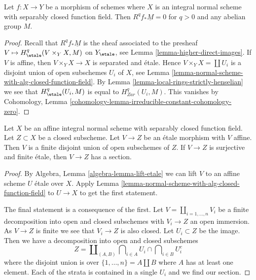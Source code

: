 \begin{lemma}
\label{lemma-Rf-star-zero-normal-with-alg-closed-function-field}
Let $f : X \to Y$ be a morphism of schemes where $X$ is an integral
normal scheme with separably closed function field. Then
$R^qf_*\underline{M} = 0$ for $q > 0$ and any abelian group $M$.
\end{lemma}

\begin{proof}
Recall that $R^qf_*\underline{M}$ is the sheaf associated
to the presheaf $V \mapsto H^q_\etale(V \times_Y X, M)$ on $Y_\etale$, see
Lemma \ref{lemma-higher-direct-images}.
If $V$ is affine, then $V \times_Y X \to X$ is separated and \'etale.
Hence $V \times_Y X = \coprod U_i$ is a disjoint union of open
subschemes $U_i$ of $X$, see
Lemma \ref{lemma-normal-scheme-with-alg-closed-function-field}.
By Lemma \ref{lemma-local-rings-strictly-henselian}
we see that $H^q_\etale(U_i, M)$ is equal to
$H^q_{Zar}(U_i, M)$. This vanishes by
Cohomology, Lemma \ref{cohomology-lemma-irreducible-constant-cohomology-zero}.
\end{proof}

\begin{lemma}
\label{lemma-closed-of-affine-normal-scheme-with-alg-closed-function-field}
Let $X$ be an affine integral normal scheme with separably closed
function field. Let $Z \subset X$ be a closed subscheme. Let
$V \to Z$ be an \'etale morphism with $V$ affine. Then $V$ is a finite
disjoint union of open subschemes of $Z$. If $V \to Z$ is
surjective and finite \'etale, then $V \to Z$ has a section.
\end{lemma}

\begin{proof}
By Algebra, Lemma \ref{algebra-lemma-lift-etale}
we can lift $V$ to an affine scheme $U$ \'etale over $X$.
Apply Lemma \ref{lemma-normal-scheme-with-alg-closed-function-field}
to $U \to X$ to get the first statement.

\medskip\noindent
The final statement is a consequence of the first.
Let $V = \coprod_{i = 1, \ldots, n} V_i$ be a finite
decomposition into open and
closed subschemes with $V_i \to Z$ an open immersion.
As $V \to Z$ is finite we see that $V_i \to Z$ is also closed.
Let $U_i \subset Z$ be the image. Then we have a decomposition
into open and closed subschemes
$$
Z =
\coprod\nolimits_{(A, B)}
\bigcap\nolimits_{i \in A} U_i \cap
\bigcap\nolimits_{i \in B} U_i^c
$$
where the disjoint union is over $\{1, \ldots, n\} = A \amalg B$
where $A$ has at least one element.
Each of the strata is contained in a single $U_i$ and
we find our section.
\end{proof}

